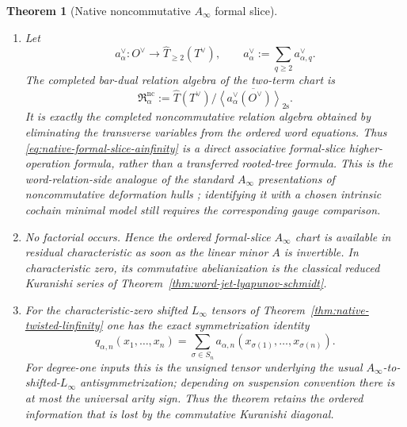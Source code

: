 \documentclass[11pt]{article}
\newtheorem{theorem}{Theorem}[section]
\theoremstyle{definition}
\begin{document}
\begin{theorem}[Native noncommutative $A_\infty$ formal slice]
\begin{enumerate}[label=\textnormal{(\roman*)}]
\item Let
\[
 a_\alpha^\vee:O^\vee
 \longrightarrow
 \widehat T_{\ge2}(T^\vee),
 \qquad
 a_\alpha^\vee:=\sum_{q\ge2}a_{\alpha,q}^\vee.
\]
The completed bar-dual relation algebra of the two-term chart is
\begin{equation}\label{eq:native-nc-relation-algebra}
 \boxed{
 \mathfrak R_\alpha^{\mathrm{nc}}
 :=
 \widehat T(T^\vee)\Big/
 \overline{\left\langle a_\alpha^\vee(O^\vee)\right\rangle_{\mathrm{2s}}}.
 }
\end{equation}
It is exactly the completed noncommutative relation algebra obtained by
eliminating the transverse variables from the ordered word equations.  Thus
\eqref{eq:native-formal-slice-ainfinity} is a direct associative
formal-slice higher-operation formula, rather than a transferred rooted-tree
formula.  This is the word-relation-side analogue of the standard
$A_\infty$ presentations of noncommutative deformation hulls
\cite{WangErickson}; identifying it with a chosen intrinsic cochain minimal
model still requires the corresponding gauge comparison.

\item No factorial occurs.  Hence the ordered formal-slice $A_\infty$ chart is
available in residual characteristic as soon as the linear minor $A$ is
invertible.  In characteristic zero, its commutative abelianization is the
classical reduced Kuranishi series of
Theorem~\ref{thm:word-jet-lyapunov-schmidt}.

\item For the characteristic-zero shifted $L_\infty$ tensors of
Theorem~\ref{thm:native-twisted-linfinity} one has the exact symmetrization
identity
\begin{equation}\label{eq:native-ainfty-linfinity-symmetrization}
 \boxed{
 q_{\alpha,n}(x_1,\ldots,x_n)
 =\sum_{\sigma\in S_n}
 a_{\alpha,n}
 (x_{\sigma(1)},\ldots,x_{\sigma(n)}).
 }
\end{equation}
For degree-one inputs this is the unsigned tensor underlying the usual
$A_\infty$-to-shifted-$L_\infty$ antisymmetrization; depending on suspension
convention there is at most the universal arity sign.  Thus the theorem
retains the ordered information that is lost by the commutative Kuranishi
diagonal.
\end{enumerate}
\end{theorem}
\end{document}

